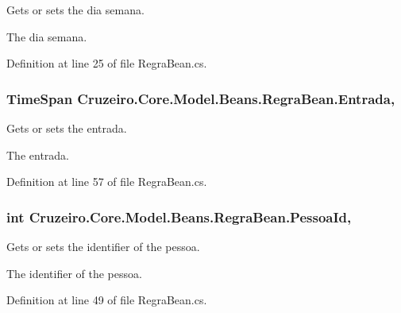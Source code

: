 Gets or sets the dia semana. 

The dia semana. 

Definition at line 25 of file Regra\+Bean.\+cs.

\subsubsection[{\texorpdfstring{Entrada}{Entrada}}]{\setlength{\rightskip}{0pt plus 5cm}Time\+Span Cruzeiro.\+Core.\+Model.\+Beans.\+Regra\+Bean.\+Entrada\hspace{0.3cm}{\ttfamily [get]}, {\ttfamily [set]}}\hypertarget{class_cruzeiro_1_1_core_1_1_model_1_1_beans_1_1_regra_bean_a68bfef053cf6dd86ad96ea1196033de8}{}\label{class_cruzeiro_1_1_core_1_1_model_1_1_beans_1_1_regra_bean_a68bfef053cf6dd86ad96ea1196033de8}


Gets or sets the entrada. 

The entrada. 

Definition at line 57 of file Regra\+Bean.\+cs.

\subsubsection[{\texorpdfstring{Pessoa\+Id}{PessoaId}}]{\setlength{\rightskip}{0pt plus 5cm}int Cruzeiro.\+Core.\+Model.\+Beans.\+Regra\+Bean.\+Pessoa\+Id\hspace{0.3cm}{\ttfamily [get]}, {\ttfamily [set]}}\hypertarget{class_cruzeiro_1_1_core_1_1_model_1_1_beans_1_1_regra_bean_a99844cc22f9fbed95ea385b8af05f371}{}\label{class_cruzeiro_1_1_core_1_1_model_1_1_beans_1_1_regra_bean_a99844cc22f9fbed95ea385b8af05f371}


Gets or sets the identifier of the pessoa. 

The identifier of the pessoa. 

Definition at line 49 of file Regra\+Bean.\+cs.

